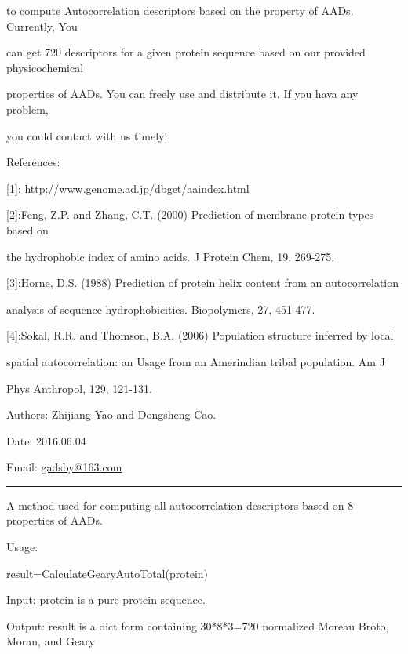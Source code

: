 \documentclass[letterpaper,10pt,english]{sphinxmanual}
\begin{document}
to compute Autocorrelation descriptors based on the property of AADs. Currently, You

can get 720 descriptors for a given protein sequence based on our provided physicochemical

properties of AADs. You can freely use and distribute it. If you hava  any problem,

you could contact with us timely!

References:

{[}1{]}: \url{http://www.genome.ad.jp/dbget/aaindex.html}

{[}2{]}:Feng, Z.P. and Zhang, C.T. (2000) Prediction of membrane protein types based on

the hydrophobic index of amino acids. J Protein Chem, 19, 269-275.

{[}3{]}:Horne, D.S. (1988) Prediction of protein helix content from an autocorrelation

analysis of sequence hydrophobicities. Biopolymers, 27, 451-477.

{[}4{]}:Sokal, R.R. and Thomson, B.A. (2006) Population structure inferred by local

spatial autocorrelation: an Usage from an Amerindian tribal population. Am J

Phys Anthropol, 129, 121-131.

Authors: Zhijiang Yao and Dongsheng Cao.

Date: 2016.06.04

Email: \href{mailto:gadsby@163.com}{gadsby@163.com}


\bigskip\hrule{}\bigskip


\begin{fulllineitems}
\label{reference/Autocorrelation:Autocorrelation.CalculateAutoTotal}
A method used for computing all autocorrelation descriptors based on 8 properties of AADs.

Usage:

result=CalculateGearyAutoTotal(protein)

Input: protein is a pure protein sequence.

Output: result is a dict form containing 30*8*3=720 normalized Moreau Broto, Moran, and Geary

\end{fulllineitems}
\end{document}
